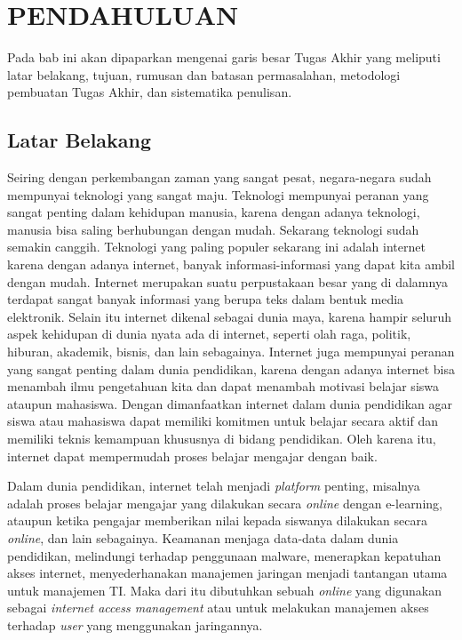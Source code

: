 \chapter{PENDAHULUAN}
Pada bab ini akan dipaparkan mengenai garis besar Tugas Akhir yang meliputi latar belakang, tujuan, rumusan dan batasan permasalahan, metodologi pembuatan Tugas Akhir, dan sistematika penulisan.

\section{Latar Belakang}
Seiring dengan perkembangan zaman yang sangat pesat, negara-negara sudah mempunyai teknologi yang sangat maju. Teknologi mempunyai peranan yang sangat penting dalam kehidupan manusia, karena dengan adanya teknologi, manusia bisa saling berhubungan dengan mudah. Sekarang teknologi sudah semakin canggih. Teknologi yang paling populer sekarang ini adalah internet karena dengan adanya internet, banyak informasi-informasi yang dapat kita ambil dengan mudah. Internet merupakan suatu perpustakaan besar yang di dalamnya terdapat sangat banyak informasi yang berupa teks dalam bentuk media elektronik. Selain itu internet dikenal sebagai dunia maya, karena hampir seluruh aspek kehidupan di dunia nyata ada di internet, seperti olah raga, politik, hiburan, akademik, bisnis, dan lain sebagainya. Internet juga mempunyai peranan yang sangat penting dalam dunia pendidikan, karena dengan adanya internet bisa menambah ilmu pengetahuan kita dan dapat menambah motivasi belajar siswa ataupun mahasiswa. Dengan dimanfaatkan internet dalam dunia pendidikan agar siswa atau mahasiswa dapat memiliki komitmen untuk belajar secara aktif dan memiliki teknis kemampuan khususnya di bidang pendidikan. Oleh karena itu, internet dapat mempermudah proses belajar mengajar dengan baik.

Dalam dunia pendidikan, internet telah menjadi \textit{platform} penting, misalnya adalah proses belajar mengajar yang dilakukan secara \textit{online} dengan e-learning, ataupun ketika pengajar memberikan nilai kepada siswanya dilakukan secara \textit{online}, dan lain sebagainya. Keamanan menjaga data-data dalam dunia pendidikan, melindungi terhadap penggunaan malware, menerapkan kepatuhan akses internet, menyederhanakan manajemen jaringan menjadi tantangan utama untuk manajemen TI. Maka dari itu dibutuhkan sebuah \textit{online} yang digunakan sebagai \textit{internet access management} atau untuk melakukan manajemen akses terhadap \textit{user} yang menggunakan jaringannya.

